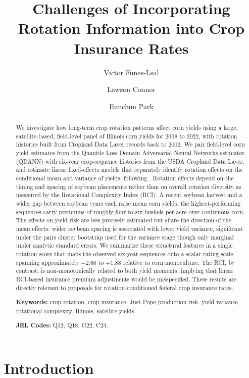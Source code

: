 \documentclass[12pt,letterpaper]{article}
\title{Challenges of Incorporating Rotation Information into Crop Insurance Rates}
\author[1]{Victor Funes-Leal}
\author[2]{Lawson Connor}
\author[3]{Eunchun Park}
\affil[1,2,3]{Department of Agricultural Economics and Agribusiness, University of Arkansas}
\date{}
\theoremstyle{remark}
\theoremstyle{remark}
\theoremstyle{plain}
\theoremstyle{definition}
\begin{document}
\maketitle
\begin{abstract}
\noindent
We investigate how long-term crop rotation patterns affect corn yields using a large, satellite-based, field-level panel of Illinois corn yields for 2008 to 2022, with rotation histories built from Cropland Data Layer records back to 2002. We pair field-level corn yield estimates from the Quantile Loss Domain Adversarial Neural Networks estimator (QDANN) with six-year crop-sequence histories from the USDA Cropland Data Layer, and estimate linear fixed-effects models that separately identify rotation effects on the conditional mean and variance of yields, following \citet{Just1979}. Rotation effects depend on the timing and spacing of soybean placements rather than on overall rotation diversity as measured by the Rotational Complexity Index (RCI). A recent soybean harvest and a wider gap between soybean years each raise mean corn yields; the highest-performing sequences carry premiums of roughly four to six bushels per acre over continuous corn. The effects on yield risk are less precisely estimated but share the direction of the mean effects: wider soybean spacing is associated with lower yield variance, significant under the pairs cluster bootstrap used for the variance stage though only marginal under analytic standard errors. We summarize these structural features in a single rotation score that maps the observed six-year sequences onto a scalar rating scale spanning approximately $-2.68$ to $+1.88$ relative to corn monoculture. The RCI, by contrast, is non-monotonically related to both yield moments, implying that linear RCI-based insurance premium adjustments would be misspecified. These results are directly relevant to proposals for rotation-conditioned federal crop insurance rates.
 
\medskip\noindent
\textbf{Keywords:} crop rotation, crop insurance, Just-Pope production risk, yield variance, rotational complexity, Illinois, satellite yields.
 
\medskip\noindent
\textbf{JEL Codes:} Q12, Q18, G22, C23.
\end{abstract}
 
\newpage
\setcounter{page}{1}
	
\section{\label{sec:intro}Introduction}
\end{document}
